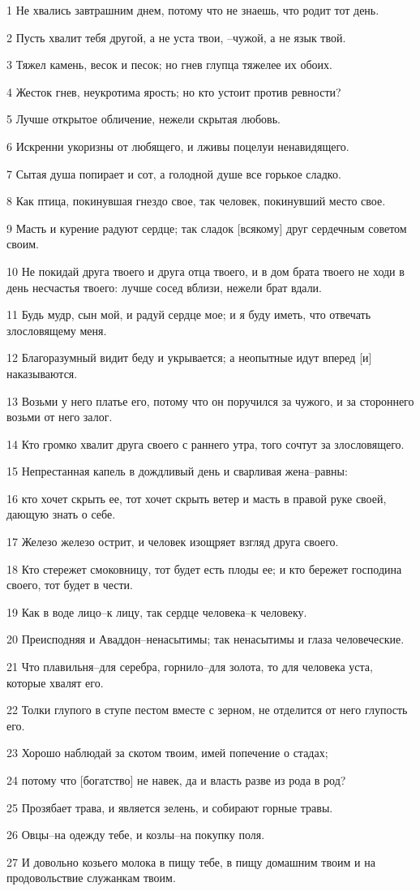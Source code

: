 \par 1 Не хвались завтрашним днем, потому что не знаешь, что родит тот день.
\par 2 Пусть хвалит тебя другой, а не уста твои, --чужой, а не язык твой.
\par 3 Тяжел камень, весок и песок; но гнев глупца тяжелее их обоих.
\par 4 Жесток гнев, неукротима ярость; но кто устоит против ревности?
\par 5 Лучше открытое обличение, нежели скрытая любовь.
\par 6 Искренни укоризны от любящего, и лживы поцелуи ненавидящего.
\par 7 Сытая душа попирает и сот, а голодной душе все горькое сладко.
\par 8 Как птица, покинувшая гнездо свое, так человек, покинувший место свое.
\par 9 Масть и курение радуют сердце; так сладок [всякому] друг сердечным советом своим.
\par 10 Не покидай друга твоего и друга отца твоего, и в дом брата твоего не ходи в день несчастья твоего: лучше сосед вблизи, нежели брат вдали.
\par 11 Будь мудр, сын мой, и радуй сердце мое; и я буду иметь, что отвечать злословящему меня.
\par 12 Благоразумный видит беду и укрывается; а неопытные идут вперед [и] наказываются.
\par 13 Возьми у него платье его, потому что он поручился за чужого, и за стороннего возьми от него залог.
\par 14 Кто громко хвалит друга своего с раннего утра, того сочтут за злословящего.
\par 15 Непрестанная капель в дождливый день и сварливая жена--равны:
\par 16 кто хочет скрыть ее, тот хочет скрыть ветер и масть в правой руке своей, дающую знать о себе.
\par 17 Железо железо острит, и человек изощряет взгляд друга своего.
\par 18 Кто стережет смоковницу, тот будет есть плоды ее; и кто бережет господина своего, тот будет в чести.
\par 19 Как в воде лицо--к лицу, так сердце человека--к человеку.
\par 20 Преисподняя и Аваддон--ненасытимы; так ненасытимы и глаза человеческие.
\par 21 Что плавильня--для серебра, горнило--для золота, то для человека уста, которые хвалят его.
\par 22 Толки глупого в ступе пестом вместе с зерном, не отделится от него глупость его.
\par 23 Хорошо наблюдай за скотом твоим, имей попечение о стадах;
\par 24 потому что [богатство] не навек, да и власть разве из рода в род?
\par 25 Прозябает трава, и является зелень, и собирают горные травы.
\par 26 Овцы--на одежду тебе, и козлы--на покупку поля.
\par 27 И довольно козьего молока в пищу тебе, в пищу домашним твоим и на продовольствие служанкам твоим.

